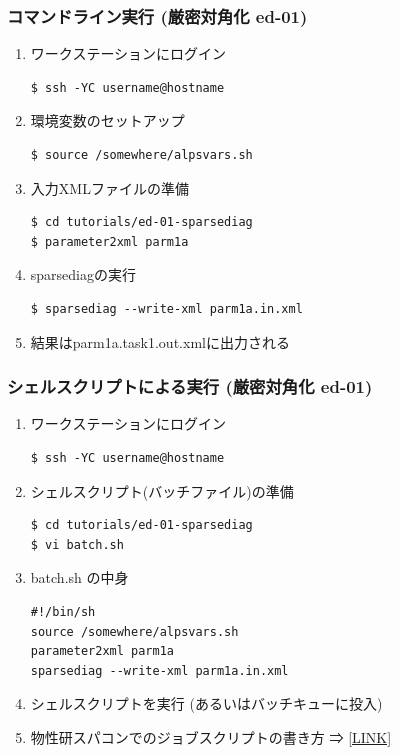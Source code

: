 \begin{frame}[t,fragile]
  \frametitle{コマンドライン実行 (厳密対角化 ed-01)}
  \begin{enumerate}
  \item ワークステーションにログイン
\begin{lstlisting}
$ ssh -YC username@hostname
\end{lstlisting}
  \item 環境変数のセットアップ
\begin{lstlisting}
$ source /somewhere/alpsvars.sh
\end{lstlisting}
  \item 入力XMLファイルの準備
\begin{lstlisting}
$ cd tutorials/ed-01-sparsediag
$ parameter2xml parm1a
\end{lstlisting}
  \item sparsediagの実行
\begin{lstlisting}
$ sparsediag --write-xml parm1a.in.xml
\end{lstlisting}
  \item 結果はparm1a.task1.out.xmlに出力される
  \end{enumerate}
\end{frame}

\begin{frame}[t,fragile]
  \frametitle{シェルスクリプトによる実行 (厳密対角化 ed-01)}
  \begin{enumerate}
  \item ワークステーションにログイン
\begin{lstlisting}
$ ssh -YC username@hostname
\end{lstlisting}
  \item シェルスクリプト(バッチファイル)の準備
\begin{lstlisting}
$ cd tutorials/ed-01-sparsediag
$ vi batch.sh
\end{lstlisting}
  \item batch.sh の中身
\begin{lstlisting}
#!/bin/sh
source /somewhere/alpsvars.sh
parameter2xml parm1a
sparsediag --write-xml parm1a.in.xml
\end{lstlisting}
  \item シェルスクリプトを実行 (あるいはバッチキューに投入)
  \item 物性研スパコンでのジョブスクリプトの書き方 ⇒ \href{http://www.issp.u-tokyo.ac.jp/supercom/for-users/x92nxz/alps}{[LINK]}
  \end{enumerate}
\end{frame}

